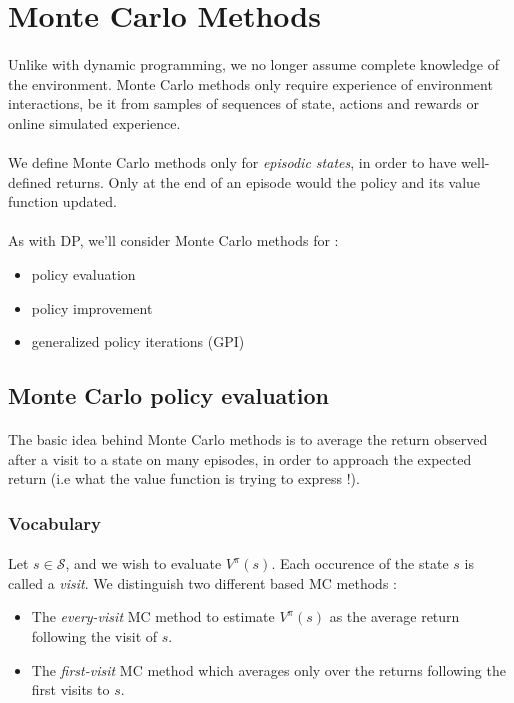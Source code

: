 \documentclass[a4paper]{article}
\begin{document}
	\section{Monte Carlo Methods}
	{
		\paragraph{} Unlike with dynamic programming, we no longer assume complete knowledge of the environment. Monte Carlo methods only require experience of environment interactions, be it from samples of sequences of state, actions and rewards or online simulated experience. 
		
		\paragraph{} We define Monte Carlo methods only for \emph{episodic states}, in order to have well-defined returns. Only at the end of an episode would the policy and its value function updated. 
		
		\paragraph{} As with DP, we'll consider Monte Carlo methods for : 
			\begin{itemize}
				\item policy evaluation 
				\item policy improvement
				\item generalized policy iterations (GPI)
			\end{itemize}
			
		\subsection{Monte Carlo policy evaluation}
		{
			\paragraph{} The basic idea behind Monte Carlo methods is to average the return observed after a visit to a state on many episodes, in order to approach the expected return (i.e what the value function is trying to express !). 
			
			\subsubsection{Vocabulary}
			{
				\paragraph{} Let $s\in\mathcal{S}$, and we wish to evaluate $V^\pi(s)$. Each occurence of the state $s$ is called a \emph{visit}. We distinguish two different based MC methods : 
				\begin{itemize}
					\item The \emph{every-visit} MC method to estimate $V^\pi(s)$ as the average return following the visit of $s$. 
					\item The \emph{first-visit} MC method which averages only over the returns following the first visits to $s$. 
				\end{itemize}
}}}
\end{document}
